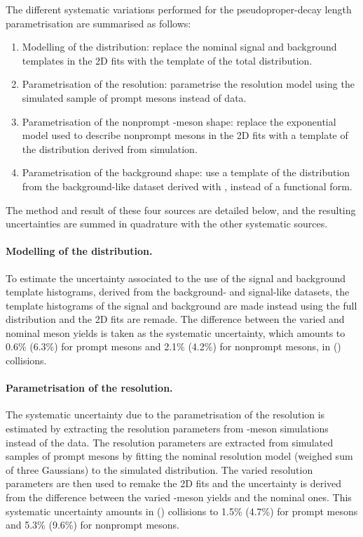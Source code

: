 The different systematic variations performed for the pseudoproper-decay length parametrisation are summarised as follows:

\begin{enumerate}
 \item Modelling of the \sigmactau distribution: replace the nominal signal and background \sigmactau templates in the 2D fits with the template of the total \sigmactau distribution.
 \item Parametrisation of the \ctau resolution: parametrise the \ctau resolution model using the simulated sample of prompt \JPsi mesons instead of data.
 \item Parametrisation of the nonprompt \JPsi-meson \ctau shape: replace the exponential \ctau model used to describe nonprompt \JPsi mesons in the 2D fits with a template of the \ctau distribution derived from simulation.
 \item Parametrisation of the background \ctau shape: use a template of the \ctau distribution from the background-like dataset derived with \sPlot, instead of a functional form.
\end{enumerate}

The method and result of these four sources are detailed below, and the resulting uncertainties are summed in quadrature with the other systematic sources.

\paragraph{Modelling of the \sigmactau distribution.} To estimate the uncertainty associated to the use of the signal and background \sigmactau template histograms, derived from the \sPlot background- and signal-like datasets, the template histograms of the signal and background are made instead using the full \sigmactau distribution and the 2D fits are remade. The difference between the varied and nominal \JPsi meson yields is taken as the systematic uncertainty, which amounts to 0.6\% (6.3\%) for prompt \JPsi mesons and 2.1\% (4.2\%) for nonprompt \JPsi mesons, in \Runpp (\RunPbPb) collisions.

\paragraph{Parametrisation of the \ctau resolution.} The systematic uncertainty due to the parametrisation of the \ctau resolution is estimated by extracting the \ctau resolution parameters from \JPsi-meson simulations instead of the data. The \ctau resolution parameters are extracted from simulated samples of prompt \JPsi mesons by fitting the nominal \ctau resolution model (weighed sum of three Gaussians) to the simulated \ctau distribution. The varied \ctau resolution parameters are then used to remake the 2D fits and the uncertainty is derived from the difference between the varied \JPsi-meson yields and the nominal ones. This systematic uncertainty amounts in \Runpp (\RunPbPb) collisions to 1.5\% (4.7\%) for prompt \JPsi mesons and 5.3\% (9.6\%) for nonprompt \JPsi mesons.


